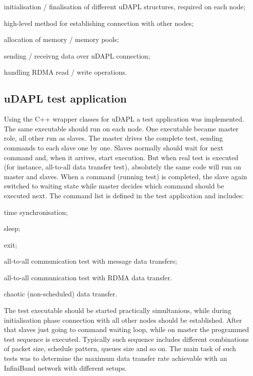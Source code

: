 \begin{compactitem}[$\bullet$]
 \item initialisation / finalisation of different uDAPL structures, required on each node; 
 \item high-level method for establishing connection with other nodes; 
 \item allocation of memory / memory pools; 
 \item sending / receivng data over uDAPL connection; 
 \item handling RDMA read / write operations.
\end{compactitem} 

\subsection{uDAPL test application}
\label{uDAPL-testapp}

Using the C++ wrapper classes for uDAPL a test application was implemented. 
The same executable should run on each node.
One executable became master role, all other run as slaves.
The master drives the complete test, sending commands to each slave one by one. 
Slaves normally should wait for next command and, when it arrives, start execution.
But when real test is executed (for instance, all-to-all data transfer test), 
absolutely the same code will run on master and slaves. 
When a command (running test) is completed, the slave again switched to waiting state 
while master decides which command should be executed next.
The command list is defined in the test application and includes:
\begin{compactitem}[$\bullet$]
 \item time synchronisation; 
 \item sleep; 
 \item exit; 
 \item all-to-all communication test with message data transfers; 
 \item all-to-all communication test with RDMA data transfer.
 \item chaotic (non-scheduled) data transfer.
\end{compactitem} 

The test executable should be started practically simultanious, 
while during initialisation phase connection with all other nodes should be established.
After that slaves just going to command waiting loop, while on master the 
programmed test sequence is executed.
Typically such sequence includes different combinations of packet size, schedule pattern, 
queues size and so on. The main task of such tests was to determine the maximum data transfer rate 
achievable with an InfiniBand network with different setups.

